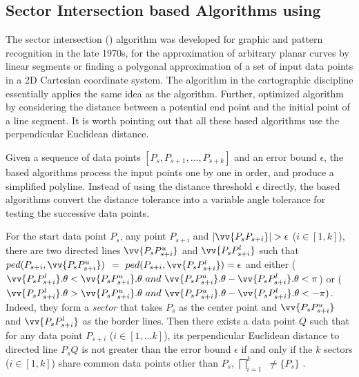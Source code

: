 \subsection{Sector Intersection based Algorithms using \ped}
\label{sub-ci-ped}





The sector intersection (\cia) algorithm \cite{Williams:Longest, Sklansky:Cone} was developed for graphic and pattern recognition in the late 1970s, for the approximation of arbitrary planar curves by linear segments or finding a polygonal approximation of a set of input data points in a 2D Cartesian coordinate system. The \sleeve algorithm \cite{Zhao:Sleeve} in the cartographic discipline essentially applies the same idea as the \cia algorithm.
Further, \cite{Dunham:Cone}  optimized algorithm \cia by considering the distance between a potential end point and the initial point of a line segment. It is worth pointing out that all these \cia based algorithms use the perpendicular Euclidean distance.


Given a sequence of data points $[P_{s}, P_{s+1}, \ldots, P_{s+k}]$ and an error bound $\epsilon$, the \cia based algorithms process the input points one by one in order, and produce a simplified polyline.  Instead of using the distance threshold $\epsilon$ directly, the \cia based algorithms convert the distance tolerance into a variable angle tolerance for testing the successive data points.

For the start data point $P_s$, any point $P_{s+i}$ and $|\vv{P_sP_{s+i}}|>\epsilon$ ($i\in[1, k]$), there are two directed lines $\vv{P_sP^u_{s+i}}$ and $\vv{P_sP^l_{s+i}}$ such that $ped(P_{s+i}, \vv{P_sP^u_{s+i}})$ $=$ $ped(P_{s+i}, \vv{P_sP^l_{s+i}}) = \epsilon$ and either ($\vv{P_sP^l_{s+i}}.\theta < \vv{P_sP^u_{s+i}}.\theta ~and~\vv{P_sP^u_{s+i}}.\theta - \vv{P_sP^l_{s+i}}.\theta <\pi$) or ($\vv{P_sP^l_{s+i}}.\theta > \vv{P_sP^u_{s+i}}.\theta ~and~ \vv{P_sP^u_{s+i}}.\theta - \vv{P_sP^l_{s+i}}.\theta < -\pi)$. Indeed, they form a \emph{sector}  that takes $P_s$ as the center point and $\vv{P_sP^u_{s+i}}$ and $\vv{P_sP^l_{s+i}}$ as the border lines.
Then there exists a data point $Q$ such that for any data point $P_{s+i}$ ($i \in [1, ... k]$), its perpendicular Euclidean distance to
directed line $\overline{P_sQ}$ is not greater than the error bound $\epsilon$ if and only if the $k$ sectors  ($i\in[1,k]$) share common data points other than $P_s$, \ie $\bigsqcap_{i=1}^{k}$ $\ne \{P_s\}$ \cite{Williams:Longest, Sklansky:Cone,Zhao:Sleeve}.

